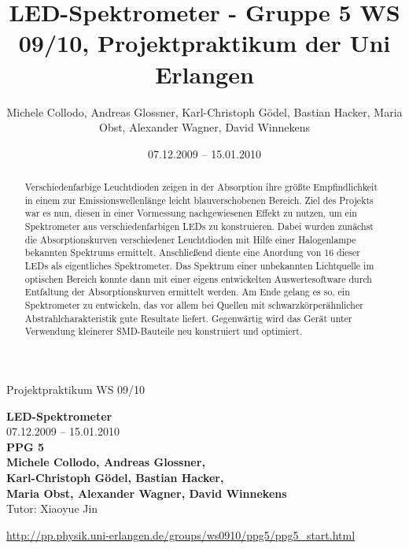 \documentclass[11pt]{scrartcl}
\title{LED-Spektrometer - Gruppe 5 WS 09/10, Projektpraktikum der Uni Erlangen}
\date{07.12.2009 -- 15.01.2010}
\author{Michele Collodo, Andreas Glossner, Karl-Christoph G\"odel, Bastian Hacker, Maria Obst, Alexander Wagner, David Winnekens}
\begin{document}
\sloppy %
\thispagestyle{empty}
\large{Projektpraktikum WS 09/10}
\hfill
{}
\\[8\baselineskip]
\begin{center}
{\fontsize{36}{54}\textbf{LED-Spektrometer}}
\\[2\baselineskip]
{\Large 07.12.2009 -- 15.01.2010}
\\[7\baselineskip]
{\huge\textbf{PPG 5}}
\\[0.5\baselineskip]
{\large\textbf{
Michele Collodo,
Andreas Glossner,\\
Karl-Christoph G\"odel,
Bastian Hacker,\\
Maria Obst,
Alexander Wagner,
David Winnekens}\\
Tutor: Xiaoyue Jin}
\vfill



\small{\url{http://pp.physik.uni-erlangen.de/groups/ws0910/ppg5/ppg5\_start.html}}
\end{center}
\newpage



\tableofcontents
\vfill



\begin{abstract} %
Verschiedenfarbige Leuchtdioden zeigen in der Absorption ihre größte Empfindlichkeit in einem zur Emissionswellenlänge leicht blauverschobenen Bereich. Ziel des Projekts war es nun, diesen in einer Vormessung nachgewiesenen Effekt zu nutzen, um ein Spektrometer aus verschiedenfarbigen LEDs zu konstruieren. 
Dabei wurden zunächst die Absorptionskurven verschiedener Leuchtdioden mit Hilfe einer Halogenlampe bekannten Spektrums ermittelt. Anschließend diente eine Anordung von 16 dieser LEDs als eigentliches Spektrometer. Das Spektrum einer unbekannten Lichtquelle im optischen Bereich konnte dann mit einer eigens entwickelten Auswertesoftware durch Entfaltung der Absorptionskurven ermittelt werden. Am Ende gelang es so, ein Spektrometer zu entwickeln, das vor allem bei Quellen mit schwarzkörperähnlicher Abstrahlcharakteristik gute Resultate liefert. Gegenwärtig wird das Gerät unter Verwendung kleinerer SMD-Bauteile neu konstruiert und optimiert. 
\end{abstract}
\newpage
\end{document}
